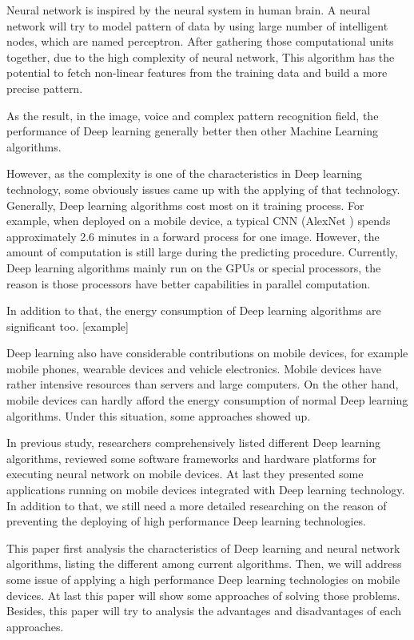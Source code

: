 \documentclass[article]{aaltoseries}
\begin{document}
Neural network is inspired by the neural system in human brain. A neural network will 
try to model pattern of data by using large number of intelligent nodes, which are named perceptron. 
After gathering those computational units together, due to the high complexity of neural network, 
This algorithm has the potential to fetch non-linear features from the training data 
and build a more precise pattern.

As the result, in the image, voice and complex pattern recognition field, the performance of Deep learning
generally better then other Machine Learning algorithms.  

However, as the complexity is one of the characteristics in Deep learning technology, some obviously
issues came up with the applying of that technology. Generally, Deep learning algorithms cost most 
on it training process. For example, when deployed on a mobile device, a typical CNN (AlexNet \cite{NIPS2012_4824}) 
spends approximately 2.6 minutes in a forward process for one image. However, the amount of computation is 
still large
during the predicting procedure. Currently, Deep learning algorithms mainly run on the GPUs or special processors, 
the reason is those processors have better capabilities in parallel computation.

In addition to that, the energy consumption of Deep learning algorithms are significant too. [example]

Deep learning also have considerable contributions on mobile devices, for example mobile phones, 
wearable devices and vehicle electronics. Mobile devices have rather intensive resources than 
servers and large computers. On the other hand, mobile devices can hardly afford the energy consumption
of normal Deep learning algorithms. Under this situation, some approaches showed up.

In previous study\cite{Ota:2017}, researchers comprehensively listed different Deep learning algorithms,
reviewed some software frameworks and hardware platforms for executing neural network on mobile devices.
At last they presented some applications running on mobile devices integrated with Deep learning technology. 
In addition to that, we still need a more detailed researching on the reason of preventing the deploying of 
high performance Deep learning technologies.

This paper first analysis the characteristics of Deep learning and neural network algorithms,
listing the different among current algorithms. Then, we will address some issue of applying a high 
performance Deep learning technologies on mobile devices.
At last this paper will show some approaches of solving those problems. Besides, this paper will try to analysis the 
advantages and disadvantages of each approaches.
\end{document}

